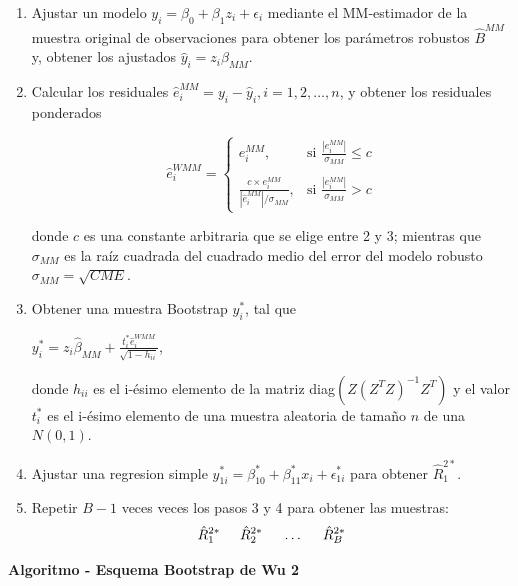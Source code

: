 \begin{enumerate}
	\item  Ajustar un modelo $y_{i} = \beta_{0} +\beta_{1}z_{i} + \epsilon_{i}$  mediante el MM-estimador de la muestra original de observaciones para obtener los parámetros robustos $\hat{B}^{MM}$ y, obtener los ajustados $\hat{y}_{i}=z_{i}\hat{\beta}_{MM}$.
	
	\item  Calcular los residuales $ \hat{e}^{MM}_{i} = y_{i}-\hat{y}_{i},i = 1,2, \dots, n$, y obtener los residuales ponderados
	\begin{center}
	\[
	\hat{e}^{WMM}_{i} =
	\begin{cases}
		e^{MM}_{i}, & \text{si } \frac{|e^{MM}_{i}|}{\sigma_{MM}} \leq c \\ \\
		\frac{c \times e^{MM}_{i}}{ | \hat{e}^{MM}_{i} | /\sigma_{MM}},     & \text{si } \frac{|e^{MM}_{i}|}{\sigma_{MM}} > c
	\end{cases}
	\]
	\end{center} 
	donde $c$ es una constante arbitraria que se elige entre 2 y 3; mientras que $\sigma_{MM}$ es la
	raíz cuadrada del cuadrado medio del error del modelo robusto $\sigma_{MM} = \sqrt{CME}$.

	\item Obtener una muestra Bootstrap $y^{*}_{i}$, tal que 
	\begin{center}
		$y^{*}_{i} =z_{i}\hat{\beta}_{MM} + \frac{t^{*}_{i}\hat{e}^{WMM}_{i}}{\sqrt{1-h_{ii}}} $,
	\end{center}
	donde $h_{ii}$ es el i-ésimo elemento de la matriz diag$(Z(Z^{T}Z)^{-1} Z^{T})$ y el valor $t^{*}_{i}$ es el
	i-ésimo elemento de una muestra aleatoria de tamaño $n$ de una $N(0,1)$.
	
	\item  Ajustar una regresion simple $ y^{*}_{1i} = \beta^{*}_{10} +\beta^{*}_{11}x_{i} + \epsilon^{*}_{1i} $ para obtener $ \hat{R}^{2*}_{1} $.
	
		\item Repetir $B - 1$ veces veces los pasos 3 y 4 para obtener las muestras:
	\[
	\hat{R}^{2*}_{1} \hspace{.5cm} \hat{R}^{2*}_{2} \hspace{.5cm} \dots \hspace{.5cm} \hat{R}^{2*}_{B}
	\]
\end{enumerate}


\textbf{Algoritmo - Esquema Bootstrap de Wu 2}

